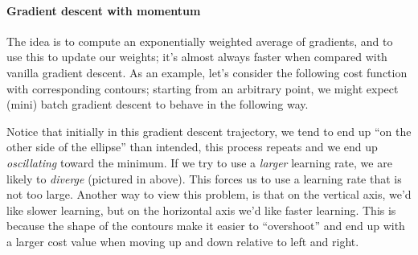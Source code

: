 \documentclass[12pt]{article}
\begin{document}
\paragraph{Gradient descent with momentum} The idea is to compute an exponentially weighted average of gradients, and to use this to update our weights; it's almost always faster when compared with vanilla gradient descent. As an example, let's consider the following cost function with corresponding contours; starting from an arbitrary point, we might expect (mini) batch gradient descent to behave in the following way.

\begin{figure}[h]
\centering
{}
\end{figure}

Notice that initially in this gradient descent trajectory, 
we tend to end up ``on the other side of the 
ellipse'' than intended, this process repeats and 
we end up \emph{oscillating} toward the minimum.
If we try to use a \emph{larger} learning rate, we are likely
to \emph{diverge} (pictured in \color{purple}{purple} 
above\color{black}).
This forces us to use a learning rate that is not too large.
Another way to view this problem, is that on the vertical 
axis, we'd like slower learning, but on the horizontal axis 
we'd like faster learning. This is because the shape of the contours make it easier to ``overshoot'' and end up with a larger cost value when moving up and down relative to left and right.
\end{document}
